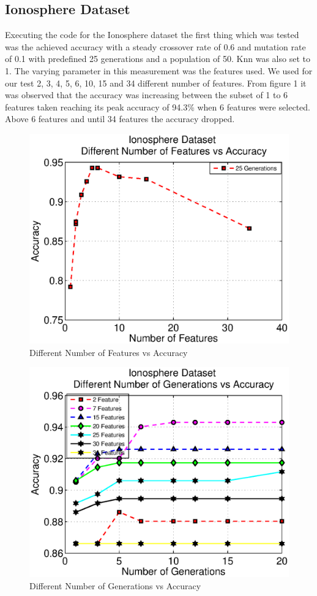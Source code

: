 \documentclass[11pt,onecolumn,a4paper]{article}
\begin{document}
\subsection{Ionosphere Dataset}

Executing the code for the Ionosphere dataset the first thing which was tested was the achieved accuracy with a steady crossover rate of 0.6 and mutation rate of 0.1 with predefined 25 generations and a population of 50. Knn was also set to 1. The varying parameter in this measurement was the features used. We used for our test 2, 3, 4, 5, 6, 10, 15 and 34 different number of features. From figure 1 it was observed that the accuracy was increasing between the subset of 1 to 6 features taken reaching its peak accuracy of 94.3\% when 6 features were selected. Above 6 features and until 34 features the accuracy dropped.    
    \begin{figure}[h!]
      \centering
      \includegraphics[width=0.6\linewidth]{img/ionfeat2.eps}
     \caption{Different Number of Features vs Accuracy}
    \end{figure}
    \begin{figure}[h!]
      \centering
      \includegraphics[width=0.6\linewidth]{img/ionfeat.eps}
      \caption{Different Number of Generations vs Accuracy}
    \end{figure}
\end{document}
